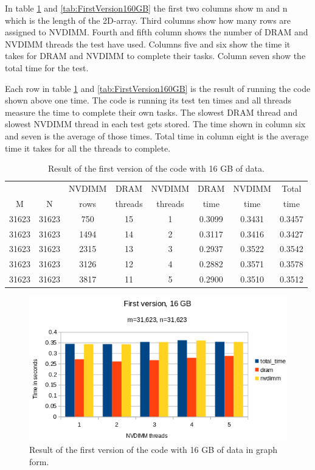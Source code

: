 \documentclass[12pt,a4paper,USenglish]{article}      %
\begin{document}
In table \ref{tab:FirstVersion16GB} and \ref{tab:FirstVersion160GB} the first two columns show m and n which is the length of the 2D-array. Third columns show how many rows are assigned to NVDIMM. Fourth and fifth column shows the number of DRAM and NVDIMM threads the test have used.
Columns five and six show the time it takes for DRAM and NVDIMM to complete their tasks. Column seven show the total time for the test.

Each row in table \ref{tab:FirstVersion16GB} and \ref{tab:FirstVersion160GB} is the result of running the code shown above one time. The code is running its test ten times and all threads measure the time to complete their own tasks. The slowest DRAM thread and slowest NVDIMM thread in each test gets stored. The time shown in column six and seven is the average of those times. Total time in column eight is the average time it takes for all the threads to complete.

\begin{table}[!hbtp]
\centering
\begin{tabular}{ |c|c|c|c|c|c|c|c| }
\hline
&  & NVDIMM & DRAM & NVDIMM & DRAM & NVDIMM & Total \\
M & N & rows & threads & threads & time & time & time \\
\hline
31623 & 31623 & 750 & 15 & 1 & 0.3099 & 0.3431 & 0.3457 \\
\hline
31623 & 31623 & 1494 & 14 & 2 & 0.3117 & 0.3416 & 0.3427 \\
\hline
31623 & 31623 & 2315 & 13 & 3 & 0.2937 & 0.3522 & 0.3542 \\
\hline
31623 & 31623 & 3126 & 12 & 4 & 0.2882 & 0.3571 & 0.3578 \\
\hline
31623 & 31623 & 3817 & 11 & 5 & 0.2900 & 0.3510 & 0.3512 \\
\hline
\end{tabular}
\caption{Result of the first version of the code with 16 GB of data.}
\label{tab:FirstVersion16GB}
\end{table}
\begin{figure}[!hbtp]
\includegraphics[scale=0.7]{Large_Array_test/First_version_16GB.png}
\caption{Result of the first version of the code with 16 GB of data in graph form.}
\label{fig:FirstVersion16GB}
\end{figure}
\end{document}

